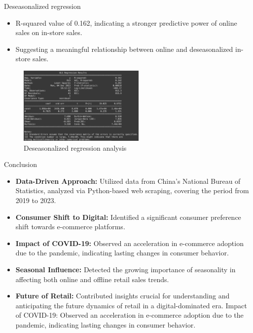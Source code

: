 \documentclass{beamer}
\begin{document}
\begin{frame}{Deseasonalized regression}
\begin{itemize}
    \item R-squared value of 0.162, indicating a stronger predictive power of online sales on in-store sales. 
    \item Suggesting a meaningful relationship between online and deseasonalized in-store sales.
  
\end{itemize}


\begin{figure}
    \centering
    \includegraphics[width=0.55\textwidth]{Deseasonalized regression.png}
    \caption{Deseasonalized regression analysis}
    \end{figure}


\end{frame}


\begin{frame}{Conclusion}
\begin{itemize}
    \item  \textbf{Data-Driven Approach:} Utilized data from China's National Bureau of Statistics, analyzed via Python-based web scraping, covering the period from 2019 to 2023.
    \item \textbf{Consumer Shift to Digital:} Identified a significant consumer preference shift towards e-commerce platforms.
     \item \textbf{Impact of COVID-19:} Observed an acceleration in e-commerce adoption due to the pandemic, indicating lasting changes in consumer behavior.
     \item  \textbf{Seasonal Influence:} Detected the growing importance of seasonality in affecting both online and offline retail sales trends.
    \item \textbf{Future of Retail:} Contributed insights crucial for understanding and anticipating the future dynamics of retail in a digital-dominated era.
Impact of COVID-19: Observed an acceleration in e-commerce adoption due to the pandemic, indicating lasting changes in consumer behavior.
\end{itemize}




\end{frame}
\end{document}
